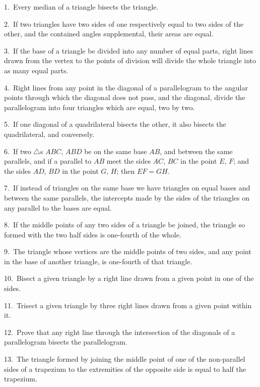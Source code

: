 \documentclass[oneside]{book}
\begin{document}
\begin{footnotesize}
1.~Every median of a triangle bisects the triangle.

2.~If two triangles have two sides of one respectively equal to
two sides of the other, and the contained angles supplemental,
their areas are equal.

3.~If the base of a triangle be divided into any number of equal
parts, right lines drawn from the vertex to the points of division
will divide the whole triangle into as many equal parts.

4.~Right lines from any point in the diagonal of a parallelogram
to the angular points through which the diagonal does not
pass, and the diagonal, divide the parallelogram into four triangles
which are equal, two by two.

5.~If one diagonal of a quadrilateral bisects the other, it also
bisects the quadrilateral, and conversely.

6.~If two $\triangle$s $ABC$, $ABD$ be on the same base $AB$, and between
the same parallels, and if a parallel to $AB$ meet the sides $AC$, $BC$
in the point $E$, $F$; and the sides $AD$, $BD$ in the point $G$, $H$; then
$EF = GH$.

7.~If instead of triangles on the same base we have triangles on
equal bases and between the same parallels, the intercepts made by
the sides of the triangles on any parallel to the bases are equal.

8.~If the middle points of any two sides of a triangle be joined,
the triangle so formed with the two half sides is one-fourth of the
whole.

9.~The triangle whose vertices are the middle points of two
sides, and any point in the base of another triangle, is one-fourth
of that triangle.

10.~Bisect a given triangle by a right line drawn from a given
point in one of the sides.

11.~Trisect a given triangle by three right lines drawn from a
given point within it.


12.~Prove that any right line through the intersection of the
diagonals of a parallelogram bisects the parallelogram\label{parallellogram}.

13.~The triangle formed by joining the middle point of one of
the non-parallel sides of a trapezium to the extremities of the
opposite side is equal to half the trapezium.
\par\end{footnotesize}
\end{document}

